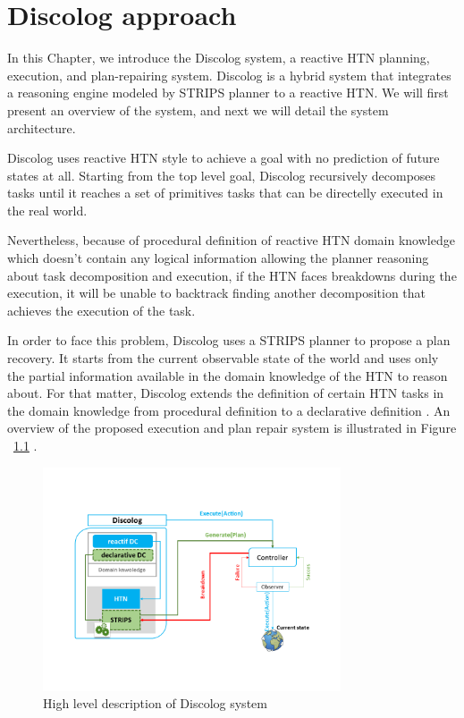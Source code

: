 \chapter{Discolog approach} %

\label{Chapter 4} %

 In this Chapter, we introduce the Discolog system, a reactive HTN planning, execution, and plan-repairing system. Discolog is a   hybrid system that integrates  a reasoning engine modeled by STRIPS planner to a reactive HTN. We will first present an overview of the system, and next we will detail the system architecture.



 Discolog uses reactive HTN style to achieve a goal with no prediction of future states at all.
 Starting from the top level goal, Discolog recursively decomposes tasks until it reaches a set of primitives tasks that can be directelly executed in the real world. 

 Nevertheless, because of procedural definition of reactive HTN domain knowledge which doesn't contain any logical information allowing the planner reasoning about task decomposition and execution, if the HTN faces breakdowns during the execution, it will be unable to backtrack  finding another decomposition that achieves the execution of the task.
 
 
In order to face this problem, Discolog uses a STRIPS planner to propose a plan recovery. It starts from the current observable state of the world and uses only the partial information available in the domain knowledge of the HTN to reason about. For that matter, Discolog extends the definition of certain HTN tasks in the domain knowledge from procedural definition to a declarative definition . An overview of the proposed execution and plan repair system is illustrated in Figure ~\ref{High level description of Discolog system}  .
		\begin{figure}[!h]
			\centering
			\includegraphics[width=250pt]{Pictures/architecture.png}
			\caption{\label{High level description of Discolog system} High level description of Discolog system}
		\end{figure}

